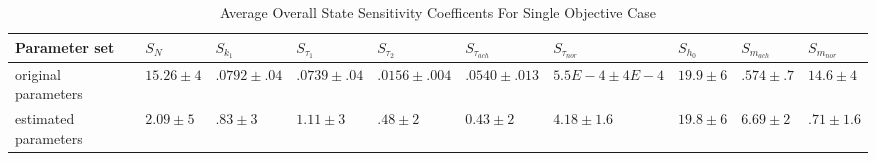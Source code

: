 \documentclass[fleqn,10pt]{wlscirep}
\begin{document}
\begin{table}[h]
\centering
\scriptsize
\caption{Average Overall State Sensitivity Coefficents For Single Objective Case}
\label{tab:OSSCsoriginalParams}
\begin{tabular}{|l|l|l|l|l|l|l|l|l|l|}
\hline
Parameter set        & $S_{N}$     & $S_{k_1}$      & $S_{\tau_1}$  & $S_{\tau_2}$   & $S_{\tau_{ach}}$ & $S_{\tau_{nor}}$ & $S_{h_0}$   & $S_{m_{ach}}$ & $S_{m_{nor}}$ \\ \hline
original parameters  & $15.26\pm4$ & $.0792\pm .04$ & $.0739\pm.04$ & $.0156\pm.004$ & $.0540\pm.013$   & $5.5E-4\pm4E-4$ & $19.9\pm 6$ & $.574\pm.7$   & $14.6\pm4$    \\ \hline
estimated parameters & $2.09\pm5$  & $.83\pm3$      & $1.11\pm3$    & $.48\pm2$      & $0.43\pm2$       & $4.18\pm1.6$     & $19.8\pm 6$ & $6.69\pm2$    & $.71\pm 1.6$  \\ \hline
\end{tabular}
\end{table} 
\end{document}

